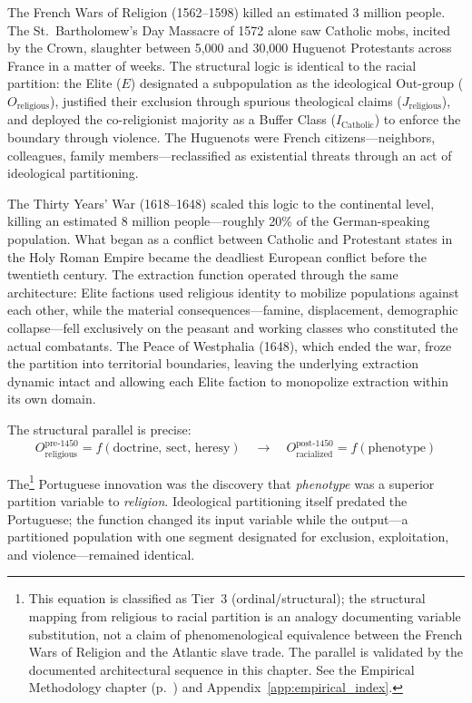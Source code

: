 The French Wars of Religion (1562--1598) killed an estimated 3 million people. The St.\ Bartholomew's Day Massacre of 1572 alone saw Catholic mobs, incited by the Crown, slaughter between 5,000 and 30,000 Huguenot Protestants across France in a matter of weeks. The structural logic is identical to the racial partition: the Elite ($E$) designated a subpopulation as the ideological Out-group ($O_{\text{religious}}$), justified their exclusion through spurious theological claims ($J_{\text{religious}}$), and deployed the co-religionist majority as a Buffer Class ($I_{\text{Catholic}}$) to enforce the boundary through violence. The Huguenots were French citizens---neighbors, colleagues, family members---reclassified as existential threats through an act of ideological partitioning.

The Thirty Years' War (1618--1648) scaled this logic to the continental level, killing an estimated 8 million people---roughly 20\% of the German-speaking population. What began as a conflict between Catholic and Protestant states in the Holy Roman Empire became the deadliest European conflict before the twentieth century. The extraction function operated through the same architecture: Elite factions used religious identity to mobilize populations against each other, while the material consequences---famine, displacement, demographic collapse---fell exclusively on the peasant and working classes who constituted the actual combatants. The Peace of Westphalia (1648), which ended the war, froze the partition into territorial boundaries, leaving the underlying extraction dynamic intact and allowing each Elite faction to monopolize extraction within its own domain.

The structural parallel is precise:
\begin{equation}\label{eq:2.6-roman-american-structural-parallel}
O_{\text{religious}}^{\text{pre-1450}} = f(\text{doctrine, sect, heresy}) \quad \longrightarrow \quad O_{\text{racialized}}^{\text{post-1450}} = f(\text{phenotype})
\end{equation}

The\footnote{This equation is classified as Tier~3 (ordinal/structural); the structural mapping from religious to racial partition is an analogy documenting variable substitution, not a claim of phenomenological equivalence between the French Wars of Religion and the Atlantic slave trade. The parallel is validated by the documented architectural sequence in this chapter. See the Empirical Methodology chapter (p.~\pageref{ch:empirical_methodology}) and Appendix~\ref{app:empirical_index}.} Portuguese innovation was the discovery that \textit{phenotype} was a superior partition variable to \textit{religion}. Ideological partitioning itself predated the Portuguese; the function changed its input variable while the output---a partitioned population with one segment designated for exclusion, exploitation, and violence---remained identical.


